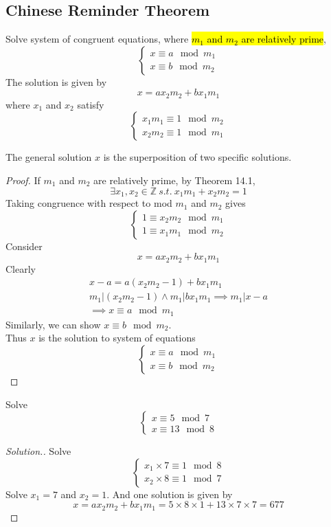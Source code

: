 \documentclass[10pt]{article}
\begin{document}
		\subsection{Chinese Reminder Theorem}
		\begin{theorem}
			Solve system of congruent equations, where \hl{$m_1$ and $m_2$ are relatively prime}, 
			\[
				\begin{cases}
					x \equiv a \mod m_1 \\
					x \equiv b \mod m_2
				\end{cases}
			\]
			The solution is given by 
			\[
				x = a x_2 m_2 + b x_1 m_1
			\]
			where $x_1$ and $x_2$ satisfy
			\[
				\begin{cases}
					x_1 m_1 \equiv 1 \mod m_2 \\
					x_2 m_2 \equiv 1 \mod m_1 
				\end{cases}
			\]
		\end{theorem}
		The general solution $x$ is the superposition of two specific solutions.
		
		\begin{proof}
			If $m_1$ and $m_2$ are relatively prime, by Theorem 14.1,
			\[
				\exists x_1, x_2 \in \mathbb{Z}\ s.t. \ x_1 m_1 + x_2 m_2 = 1
			\]
			Taking congruence with respect to mod $m_1$ and $m_2$ gives
			\[
				\begin{cases}
					1 \equiv x_2 m_2 \mod m_1 \\
					1 \equiv x_1 m_1 \mod m_2
				\end{cases}
			\]
			Consider 
			\[
				x = a x_2 m_2 + b x_1 m_1
			\]
			Clearly 
			\begin{gather*}
				x - a = a(x_2 m_2 - 1) + b x_1 m_1 \\
				m_1 | (x_2 m_2 - 1) \land m_1 | b x_1 m_1 \implies m_1 | x - a \\
				\implies x \equiv a \mod m_1
			\end{gather*}
			Similarly, we can show $x \equiv b \mod m_2$. \\
			Thus $x$ is the solution to system of equations 
			\[
				\begin{cases}
					x \equiv a \mod m_1 \\
					x \equiv b \mod m_2
				\end{cases}
			\]
		\end{proof}
		
		\begin{example}
			Solve
			\[
				\begin{cases}
					x \equiv 5 \mod 7 \\
					x \equiv 13 \mod 8
				\end{cases}
			\]
		\end{example}
		\begin{proof}[Solution.]
			Solve 
			\[
				\begin{cases}
					x_1 \times 7 \equiv 1 \mod 8 \\
					x_2 \times 8 \equiv 1 \mod 7
				\end{cases}
			\]
			Solve $x_1 = 7$ and $x_2 = 1$. And one solution is given by 
			\[
				x = a x_2 m_2 + b x_1 m_1 = 5 \times 8 \times 1 + 13 \times 7 \times 7 = 677
			\]
		\end{proof}
\end{document}
